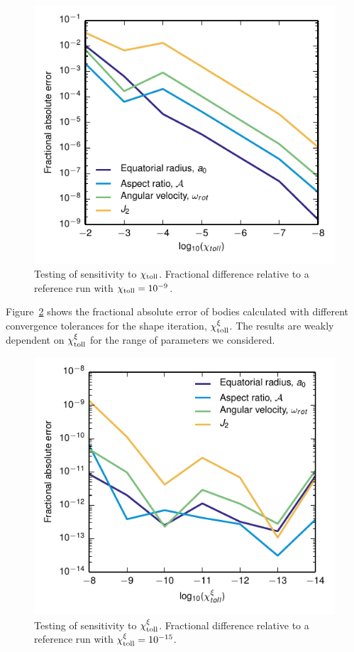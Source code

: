 \documentclass[11pt, oneside]{article}   	%
\begin{document}
\begin{figure}[]
   \centering
   \includegraphics[]{Figures/Test_toll.pdf} 
   \caption{Testing of sensitivity to $\chi_{\rm toll}$. Fractional difference relative to a reference run with $\chi_{\rm toll}=10^{-9}$.}
   \label{HUG:fig:test_toll}
\end{figure}

Figure~\ref{HUG:fig:test_xi_toll} shows the fractional absolute error of bodies calculated with different convergence tolerances for the shape iteration, $\chi_{\rm toll}^{\xi}$. The results are weakly dependent on $\chi_{\rm toll}^{\xi}$ for the range of parameters we considered.

\begin{figure}[]
   \centering
   \includegraphics[]{Figures/Test_xi_toll.pdf} 
   \caption{Testing of sensitivity to $\chi_{\rm toll}^{\xi}$. Fractional difference relative to a reference run with $\chi_{\rm toll}^{\xi}=10^{-15}$.}
   \label{HUG:fig:test_xi_toll}
\end{figure}
\end{document}
